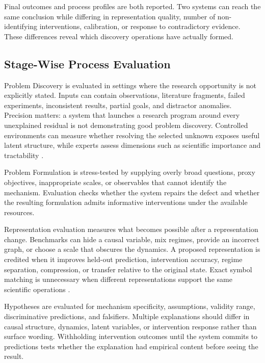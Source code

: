 \documentclass[11pt, a4paper, copyright]{google}
\begin{document}
Final outcomes and process profiles are both reported. Two systems can reach the same conclusion while differing in representation quality, number of non-identifying interventions, calibration, or response to contradictory evidence. These differences reveal which discovery operations have actually formed.

\subsection{Stage-Wise Process Evaluation}
\label{subsec:evaluating-problems}

Problem Discovery is evaluated in settings where the research opportunity is not explicitly stated. Inputs can contain observations, literature fragments, failed experiments, inconsistent results, partial goals, and distractor anomalies. Precision matters: a system that launches a research program around every unexplained residual is not demonstrating good problem discovery. Controlled environments can measure whether resolving the selected unknown exposes useful latent structure, while experts assess dimensions such as scientific importance and tractability \citep{majumder2025discoverybench,chen2025scienceagentbench}.

Problem Formulation is stress-tested by supplying overly broad questions, proxy objectives, inappropriate scales, or observables that cannot identify the mechanism. Evaluation checks whether the system repairs the defect and whether the resulting formulation admits informative interventions under the available resources.

Representation evaluation measures what becomes possible after a representation change. Benchmarks can hide a causal variable, mix regimes, provide an incorrect graph, or choose a scale that obscures the dynamics. A proposed representation is credited when it improves held-out prediction, intervention accuracy, regime separation, compression, or transfer relative to the original state. Exact symbol matching is unnecessary when different representations support the same scientific operations \citep{gandhi2025boxinggym}.

Hypotheses are evaluated for mechanism specificity, assumptions, validity range, discriminative predictions, and falsifiers. Multiple explanations should differ in causal structure, dynamics, latent variables, or intervention response rather than surface wording. Withholding intervention outcomes until the system commits to predictions tests whether the explanation had empirical content before seeing the result.
\end{document}
